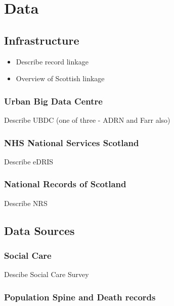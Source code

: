 \documentclass[12pt,]{report}
\begin{document}
\FloatBarrier
\newpage
{}

\chapter{Data}\label{ch:data}

\section{Infrastructure}\label{sec:infrastructure}

\begin{itemize}[noitemsep]
\item Describe record linkage
\item Overview of Scottish linkage
\end{itemize}

\subsection{Urban Big Data Centre}\label{subsec:ubdc}

Describe UBDC (one of three - ADRN and Farr also)

\subsection{NHS National Services Scotland}\label{subsec:edris}

Describe eDRIS

\subsection{National Records of Scotland}\label{subsec:nrs}

Describe NRS

\section{Data Sources}\label{sec:sources}

\subsection{Social Care}\label{subsec:source-sc}

Descibe Social Care Survey

\subsection{Population Spine and Death records}
\end{document}
